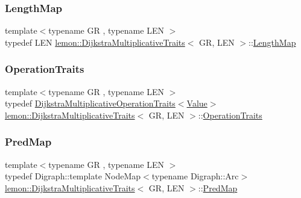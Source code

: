 \subsubsection{\texorpdfstring{Length\+Map}{LengthMap}}
{\footnotesize\ttfamily template$<$typename GR , typename L\+EN $>$ \\
typedef L\+EN \hyperlink{structlemon_1_1_dijkstra_multiplicative_traits}{lemon\+::\+Dijkstra\+Multiplicative\+Traits}$<$ GR, L\+EN $>$\+::\hyperlink{structlemon_1_1_dijkstra_multiplicative_traits_a71b3ebdd887bad38c0a80bdee34204b7}{Length\+Map}}

\mbox{\label{structlemon_1_1_dijkstra_multiplicative_traits_affb2683da11abbf82ff4e5004046c53d}} 
\subsubsection{\texorpdfstring{Operation\+Traits}{OperationTraits}}
{\footnotesize\ttfamily template$<$typename GR , typename L\+EN $>$ \\
typedef \hyperlink{structlemon_1_1_dijkstra_multiplicative_operation_traits}{Dijkstra\+Multiplicative\+Operation\+Traits}$<$\hyperlink{structlemon_1_1_dijkstra_multiplicative_traits_a6e84de41f8b2d8c17974487766c465cf}{Value}$>$ \hyperlink{structlemon_1_1_dijkstra_multiplicative_traits}{lemon\+::\+Dijkstra\+Multiplicative\+Traits}$<$ GR, L\+EN $>$\+::\hyperlink{structlemon_1_1_dijkstra_multiplicative_traits_affb2683da11abbf82ff4e5004046c53d}{Operation\+Traits}}

\mbox{\label{structlemon_1_1_dijkstra_multiplicative_traits_aa69cc345580a8a6619b0add76aae29e0}} 
\subsubsection{\texorpdfstring{Pred\+Map}{PredMap}}
{\footnotesize\ttfamily template$<$typename GR , typename L\+EN $>$ \\
typedef Digraph\+::template Node\+Map$<$typename Digraph\+::\+Arc$>$ \hyperlink{structlemon_1_1_dijkstra_multiplicative_traits}{lemon\+::\+Dijkstra\+Multiplicative\+Traits}$<$ GR, L\+EN $>$\+::\hyperlink{structlemon_1_1_dijkstra_multiplicative_traits_aa69cc345580a8a6619b0add76aae29e0}{Pred\+Map}}

